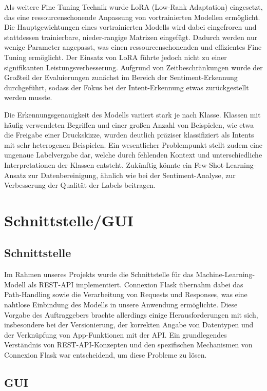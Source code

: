 Als weitere Fine Tuning Technik wurde LoRA (Low-Rank Adaptation) eingesetzt, das eine ressourcenschonende Anpassung von vortrainierten Modellen ermöglicht. Die Hauptgewichtungen eines vortrainierten Modells wird dabei eingefroren und stattdessen trainierbare, nieder-rangige Matrizen eingefügt. Dadurch werden nur wenige Parameter angepasst, was einen ressourcenschonenden und effizientes Fine Tuning ermöglicht.
Der Einsatz von LoRA führte jedoch nicht zu einer signifikanten Leistungsverbesserung. Aufgrund von Zeitbeschränkungen wurde der Großteil der Evaluierungen zunächst im Bereich der Sentiment-Erkennung durchgeführt, sodass der Fokus bei der Intent-Erkennung etwas zurückgestellt werden musste.

Die Erkennungsgenauigkeit des Modells variiert stark je nach Klasse. Klassen mit häufig verwendeten Begriffen und einer großen Anzahl von Beispielen, wie etwa die Freigabe einer Druckskizze, wurden deutlich präziser klassifiziert als Intents mit sehr heterogenen Beispielen. Ein wesentlicher Problempunkt stellt zudem eine ungenaue Labelvergabe dar, welche durch fehlenden Kontext und unterschiedliche Interpretationen der Klassen entsteht. Zukünftig könnte ein Few-Shot-Learning-Ansatz zur Datenbereinigung, ähnlich wie bei der Sentiment-Analyse, zur Verbesserung der Qualität der Labels beitragen.


\section{Schnittstelle/GUI}

\subsection{Schnittstelle}

Im Rahmen unseres Projekts wurde die Schnittstelle für das Machine-Learning-Modell als REST-API implementiert.
Connexion Flask übernahm dabei das Path-Handling sowie die Verarbeitung von Requests und Responses, was eine
nahtlose Einbindung des Modells in unsere Anwendung ermöglichte. Diese Vorgabe des Auftraggebers brachte
allerdings einige Herausforderungen mit sich, insbesondere bei der Versionierung, der korrekten Angabe
von Datentypen und der Verknüpfung von App-Funktionen mit der API. Ein grundlegendes Verständnis von
REST-API-Konzepten und den spezifischen Mechanismen von Connexion Flask war entscheidend, um diese Probleme
zu lösen. 

\subsection{GUI}

